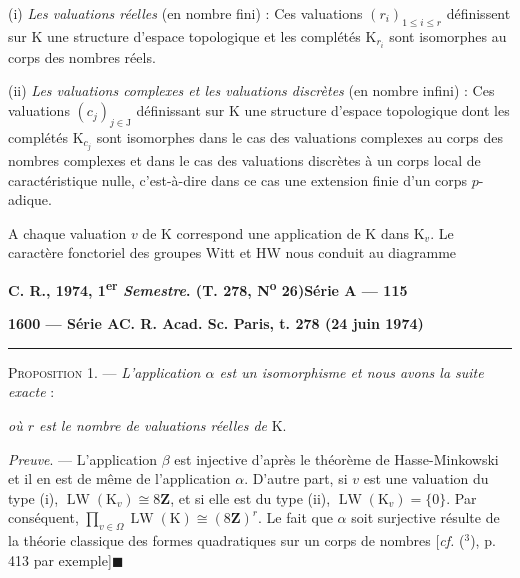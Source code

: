 (i) \emph{Les valuations réelles} (en nombre fini) : Ces valuations $(r_i)_{1\le i\le r}$ définissent sur K
une structure d'espace topologique et les complétés $\mathrm K_{r_i}$ sont isomorphes au corps des
nombres réels.

(ii) \emph{Les valuations complexes et les valuations discrètes} (en nombre infini) : Ces
valuations $(c_j)_{j\in\mathrm J}$ définissant sur K une structure d'espace topologique dont les complétés $\mathrm K_{c_j}$
sont isomorphes dans le cas des valuations complexes au corps des nombres complexes
et dans le cas des valuations discrètes à un corps local de caractéristique nulle, c'est-à-dire
dans ce cas une extension finie d'un corps $p$-adique.

A chaque valuation $v$ de K correspond une application de K dans $\mathrm K_v$. Le caractère
fonctoriel des groupes Witt et HW nous conduit au diagramme


\textbf{C. R., 1974, 1\textsuperscript{er} \emph{Semestre}. (T. 278, N\textsuperscript{o} 26)}\hfill\textbf{Série A — 115}

\textbf{1600 — Série A}\hfill\textbf{C. R. Acad. Sc. Paris, t. 278 (24 juin 1974)}

\rule{\linewidth}{0.4pt}

\textsc{Proposition 1}. — \emph{L'application $\alpha$ est un isomorphisme et nous avons la suite exacte} :


\emph{où $r$ est le nombre de valuations réelles de} K.

\emph{Preuve}. — L'application $\beta$ est injective d'après le théorème de Hasse-Minkowski et
il en est de même de l'application $\alpha$. D'autre part, si $v$ est une valuation du type (i),
$\operatorname{LW}(\mathrm K_v)\cong8\mathbf Z$, et si elle est du type (ii), $\operatorname{LW}(\mathrm K_v)=\{0\}$. Par conséquent,
$\displaystyle\prod_{v\in\Omega}\operatorname{LW}(\mathrm K)\cong(8\mathbf Z)^r$. Le fait que $\alpha$ soit surjective résulte de la théorie classique des formes
quadratiques sur un corps de nombres [\emph{cf.} (${}^3$), p. 413 par exemple]\quad$\blacksquare$

